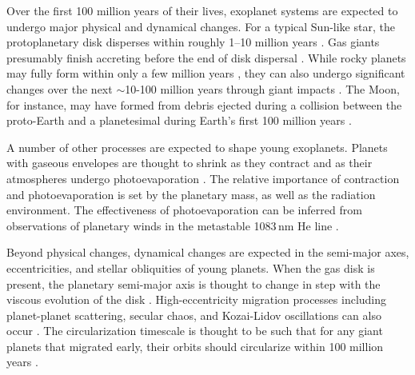 \documentclass[12pt,twocolumn,tighten]{aastex63}
\begin{document}
Over the first 100 million years of their lives, exoplanet systems are
expected to undergo major physical and dynamical changes.  For a
typical Sun-like star, the protoplanetary disk disperses within
roughly 1--10 million years
\citep{mamajek_initial_2009,dullemond_inner_2010,williams_protoplanetary_2011}.
Gas giants presumably finish accreting before the end of disk
dispersal \citep{pollack_formation_1996}.  While rocky planets may
fully form within only a few million years
\citep{dauphas_hf-w-th_2011}, they can also undergo significant
changes over the next $\sim$10-100 million years through giant impacts
\citep[{\it
e.g.},][]{kleine_hf-w_2009,konig_earths_2011,raymond_terrestrial_2014}.
The Moon, for instance, may have formed from debris ejected during a
collision between the proto-Earth and a planetesimal during Earth's
first 100 million years \citep{cameron_origin_1976,canup_origin_2001}.

A number of other processes are expected to shape young exoplanets.
Planets with gaseous envelopes are thought to shrink as they contract
and as their atmospheres undergo photoevaporation \citep[{\it
e.g.},][]{Fortney_et_al_2007,Owen_Wu_2013,Fulton_et_al_2017}.  The
relative importance of contraction and photoevaporation is set by the
planetary mass, as well as the radiation environment.  The
effectiveness of photoevaporation can be inferred from observations of
planetary winds in the metastable 1083$\,$nm He line
\citep{spake_helium_2018,oklopcic_new_2018,mansfield_detection_2018}.

Beyond physical changes, dynamical changes are expected in the semi-major axes,
eccentricities, and stellar obliquities of young planets.  When the gas disk is
present, the planetary semi-major axis is thought to change in step with the
viscous evolution of the disk \citep{lin_orbital_1996}.  High-eccentricity
migration processes including planet-planet scattering, secular chaos, and
Kozai-Lidov oscillations can also occur \citep[{\it
e.g.},][]{chatterjee_dynamical_2008,lithwick_secular_2014,fabrycky_shrinking_2007}.
The circularization timescale is thought to be such that for any giant planets
that migrated early, their orbits should circularize within 100 million years
\citep{zahn_tidal_1977}.
\end{document}
